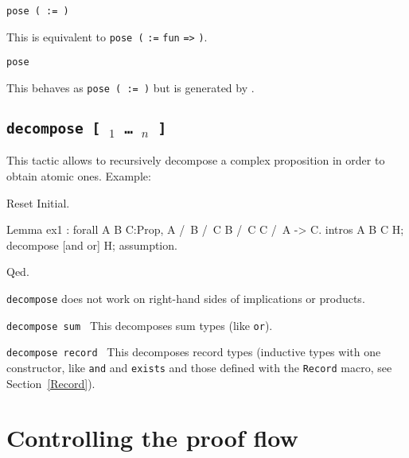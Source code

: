 \begin{coq_example*}
\begin{Variants}
\item {\tt pose ( {\ident} \nelist{\binder}{} := {\term} )}

  This is equivalent to {\tt pose (} {\ident} {\tt :=} {\tt fun}
  \nelist{\binder}{} {\tt =>} {\term} {\tt )}.

\item{\tt pose {\term}}

  This behaves as {\tt pose ( {\ident} := {\term} )} but
  {\ident} is generated by {\Coq}.

\end{Variants}

\subsection{\tt decompose [ {\qualid$_1$} \dots\ {\qualid$_n$} ] \term}
\label{decompose}

This tactic allows to recursively decompose a
complex proposition in order to obtain atomic ones.
Example:

\begin{coq_eval}
Reset Initial.
\end{coq_eval}
\begin{coq_example}
Lemma ex1 : forall A B C:Prop, A /\ B /\ C \/ B /\ C \/ C /\ A -> C.
intros A B C H; decompose [and or] H; assumption.
\end{coq_example}
\begin{coq_example*}
Qed.
\end{coq_example*}

{\tt decompose} does not work on right-hand sides of implications or products.

\begin{Variants}

\item {\tt decompose sum \term}
  This decomposes sum types (like \texttt{or}).

\item {\tt decompose record \term}
  This decomposes record types (inductive types with one constructor,
  like \texttt{and} and \texttt{exists} and those defined with the
  \texttt{Record} macro, see Section~\ref{Record}).

\end{Variants}

\section{Controlling the proof flow}


\end{coq_example*}

